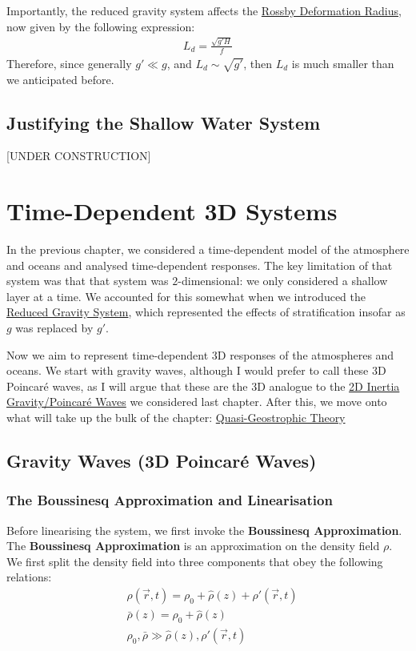 Importantly, the reduced gravity system affects the \hyperref[SW Def Radius Box]{Rossby Deformation Radius}, now given by the following expression:
\begin{align*}
    L_d = \frac{\sqrt{g' H}}{f}
\end{align*}
Therefore, since generally $g'\ll g$, and $L_d\sim\sqrt{g'}$, then $L_d$ is much smaller than we anticipated before.

\section{Justifying the Shallow Water System}\label{SW Justification}

[UNDER CONSTRUCTION]

\chapter{Time-Dependent 3D Systems}\label{3D Systems}

In the previous chapter, we considered a time-dependent model of the atmosphere and oceans and analysed time-dependent responses. The key limitation of that system was that that system was $2$-dimensional: we only considered a shallow layer at a time. We accounted for this somewhat when we introduced the \hyperref[RG Box]{Reduced Gravity System}, which represented the effects of stratification insofar as $g$ was replaced by $g'$. 

Now we aim to represent time-dependent 3D responses of the atmospheres and oceans. We start with gravity waves, although I would prefer to call these 3D Poincaré waves, as I will argue that these are the 3D analogue to the \hyperref[2D Poincare]{2D Inertia Gravity/Poincaré Waves} we considered last chapter. After this, we move onto what will take up the bulk of the chapter: \hyperref[QG]{Quasi-Geostrophic Theory}

\section{Gravity Waves (3D Poincaré Waves)}

\subsection{The Boussinesq Approximation and Linearisation}

Before linearising the system, we first invoke the \textbf{Boussinesq Approximation}. The \textbf{Boussinesq Approximation} is an approximation on the density field $\rho$. We first split the density field into three components that obey the following relations:
\begin{align*}
    &\rho(\vec{r},t)=\rho_0 + \hat{\rho}(z) + \rho'(\vec{r},t)
    \\
    &\bar{\rho}(z)=\rho_0 + \hat{\rho}(z)
    \\
    &\rho_0,\bar{\rho} \gg \hat{\rho}(z),\rho'(\vec{r},t)
\end{align*}

